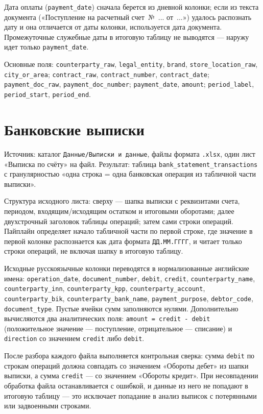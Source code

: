 Дата оплаты (\texttt{payment\_date}) сначала берется из дневной колонки; если из текста документа («Поступление на расчетный счет~№~... от~...») удалось распознать дату и она отличается от даты колонки, используется дата документа. Промежуточные служебные даты в итоговую таблицу не выводятся — наружу идет только \texttt{payment\_date}.

Основные поля: \texttt{counterparty\_raw}, \texttt{legal\_entity}, \texttt{brand}, \texttt{store\_location\_raw}, \texttt{city\_or\_area}; \texttt{contract\_raw}, \texttt{contract\_number}, \texttt{contract\_date}; \texttt{payment\_doc\_raw}, \texttt{payment\_doc\_number}; \texttt{payment\_date}, \texttt{amount}; \texttt{period\_label}, \texttt{period\_start}, \texttt{period\_end}.

\section{Банковские выписки}

Источник: каталог \texttt{Данные/Выписки и данные}, файлы формата \texttt{.xlsx}, один лист «Выписка по счёту» на файл. Результат: таблица \texttt{bank\_statement\_transactions} с гранулярностью «одна строка = одна банковская операция из табличной части выписки».

Структура исходного листа: сверху — шапка выписки с реквизитами счета, периодом, входящим/исходящим остатком и итоговыми оборотами; далее двухстрочный заголовок таблицы операций; затем сами строки операций. Пайплайн определяет начало табличной части по первой строке, где значение в первой колонке распознается как дата формата \texttt{ДД.ММ.ГГГГ}, и читает только строки операций, не включая шапку в итоговую таблицу.

Исходные русскоязычные колонки переводятся в нормализованные английские имена: \texttt{operation\_date}, \texttt{document\_number}, \texttt{debit}, \texttt{credit}, \texttt{counterparty\_name}, \texttt{counterparty\_inn}, \texttt{counterparty\_kpp}, \texttt{counterparty\_account}, \texttt{counterparty\_bik}, \texttt{counterparty\_bank\_name}, \texttt{payment\_purpose}, \texttt{debtor\_code}, \texttt{document\_type}. Пустые ячейки сумм заполняются нулями. Дополнительно вычисляются два аналитических поля: \texttt{amount = credit - debit} (положительное значение — поступление, отрицательное — списание) и \texttt{direction} со значением \texttt{credit} либо \texttt{debit}.

После разбора каждого файла выполняется контрольная сверка: сумма \texttt{debit} по строкам операций должна совпадать со значением «Обороты дебет» из шапки выписки, а сумма \texttt{credit} — со значением «Обороты кредит». При несовпадении обработка файла останавливается с ошибкой, и данные из него не попадают в итоговую таблицу — это исключает попадание в анализ выписок с потерянными или задвоенными строками.

